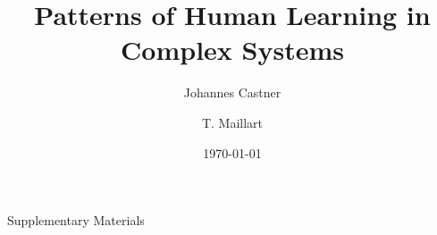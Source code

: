 \documentclass[12pt]{revtex4}
\begin{document}
\title{Patterns of Human Learning in Complex Systems}


\author{Johannes Castner}

\author{T. Maillart}



\date{\today}


\begin{abstract}

\end{abstract}

\maketitle









\clearpage


\clearpage
%

\renewcommand\thesection{\alph{section}}
\setcounter{section}{0}

\begin{center}
{\Large Supplementary Materials}
\vspace{3cm}
\end{center}


\end{document}
